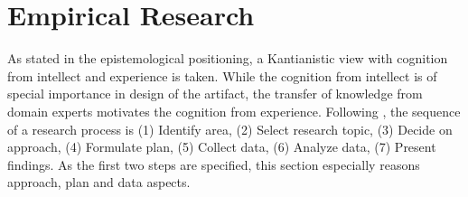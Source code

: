 
%
%	
%
%
%
%
%		
		
		
	
	\section{Empirical Research}
	As stated in the epistemological positioning, a Kantianistic view with cognition from intellect and experience is taken. While the cognition from intellect is of special importance in design of the artifact, the transfer of knowledge from domain experts motivates the cognition from experience. 
	Following \cite{gilljohnson}, the sequence of a research process is (1) Identify area, (2) Select research topic, (3) Decide on approach, (4) Formulate plan, (5) Collect data, (6) Analyze data, (7) Present findings. As the first two steps are specified, this section especially reasons approach, plan and data aspects. 
	

